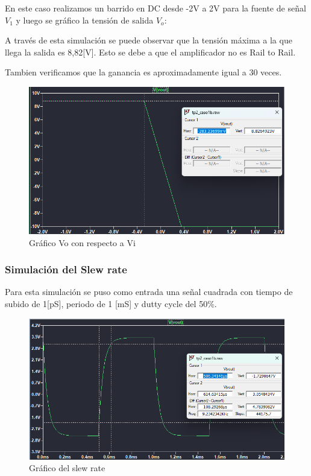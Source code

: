 En este caso realizamos un barrido en DC desde -2V a 2V para la fuente de señal $V_1$ y luego se gráfico la tensión de salida $V_o$:

A través de esta simulación se puede observar que la tensión máxima a la que llega la salida es 8,82[V]. Esto se debe a que el amplificador no es Rail to Rail. 

Tambien verificamos que la ganancia es aproximadamente igual a 30 veces.

\begin{figure}[h!]
    \centering
    \includegraphics[width=0.80\linewidth]{img/vo_vi.png}
    \caption{Gráfico Vo con respecto a Vi}
    \label{fig:vo_vi}
\end{figure}

\vspace{1em}

\subsubsection{Simulación del Slew rate }

Para esta simulación se puso como entrada una señal cuadrada con tiempo de subido de 1[pS], periodo de 1 [mS] y dutty cycle del 50\%. 

\begin{figure}[h!]
    \centering
    \includegraphics[width=0.90\linewidth]{img/slew_rate.png}
    \caption{Gráfico del slew rate}
    \label{fig:slew_rate}
\end{figure}


